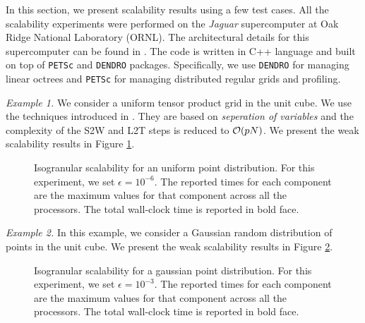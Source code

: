 
In this section, we present scalability results using a few test cases.  All the scalability experiments were performed 
on the {\it{Jaguar}} supercomputer at Oak Ridge National Laboratory (ORNL). The architectural details for this supercomputer
 can be found in \cite{jaguar}. The code is written in C++ language and built on top of \texttt{PETSc} and \texttt{DENDRO} packages. 
 Specifically, we use \texttt{DENDRO} for managing linear octrees and \texttt{PETSc} for managing distributed regular grids and profiling. 

{\em Example 1.} We consider a uniform tensor product grid in the unit cube. We use the techniques introduced in \cite{fggt}. They are based on {\em seperation of variables} and the complexity of the S2W and L2T steps is reduced to $\mathcal{O}(p N)$. We present the weak scalability results in Figure \ref{fig:uniform}. 

\begin{figure}
	\begin{center}
	
	\end{center}
\caption{\label{f:isoUniform} Isogranular scalability for an uniform point distribution. For
 this experiment, we set $\epsilon = 10^{-6}$. The reported times for 
each component are the maximum values for that component across all the processors. The total wall-clock
time is reported in bold face.} \label{fig:uniform}
\end{figure}

{\em Example 2.} In this example, we consider a Gaussian random distribution of points in the unit cube. 
We present the weak scalability results in Figure \ref{fig:nonuniform}. 

\begin{figure}
	\begin{center}
	
	\end{center}
\caption{\label{f:isoGaussian} Isogranular scalability for a gaussian point distribution. For
 this experiment, we set $\epsilon = 10^{-3}$. The reported times for each component are the
 maximum values for that component across all the processors. The total wall-clock
time is reported in bold face.} \label{fig:nonuniform}
\end{figure}
